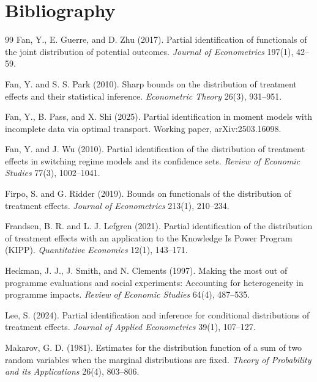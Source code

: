 \documentclass[11pt]{article}
\theoremstyle{definition}
\theoremstyle{plain}
\theoremstyle{remark}
\begin{document}
\section*{Bibliography}
\begin{thebibliography}{99}
Fan, Y., E. Guerre, and D. Zhu (2017).
Partial identification of functionals of the joint distribution of potential outcomes.
\emph{Journal of Econometrics} 197(1), 42--59.

Fan, Y. and S. S. Park (2010).
Sharp bounds on the distribution of treatment effects and their statistical inference.
\emph{Econometric Theory} 26(3), 931--951.

Fan, Y., B. Pass, and X. Shi (2025).
Partial identification in moment models with incomplete data via optimal transport.
Working paper, arXiv:2503.16098.

Fan, Y. and J. Wu (2010).
Partial identification of the distribution of treatment effects in switching regime
models and its confidence sets.
\emph{Review of Economic Studies} 77(3), 1002--1041.

Firpo, S. and G. Ridder (2019).
Bounds on functionals of the distribution of treatment effects.
\emph{Journal of Econometrics} 213(1), 210--234.

Frandsen, B. R. and L. J. Lefgren (2021).
Partial identification of the distribution of treatment effects with an application to
the Knowledge Is Power Program (KIPP).
\emph{Quantitative Economics} 12(1), 143--171.

Heckman, J. J., J. Smith, and N. Clements (1997).
Making the most out of programme evaluations and social experiments: Accounting for
heterogeneity in programme impacts.
\emph{Review of Economic Studies} 64(4), 487--535.

Lee, S. (2024).
Partial identification and inference for conditional distributions of treatment effects.
\emph{Journal of Applied Econometrics} 39(1), 107--127.

Makarov, G. D. (1981).
Estimates for the distribution function of a sum of two random variables when the
marginal distributions are fixed.
\emph{Theory of Probability and its Applications} 26(4), 803--806.


\end{thebibliography}
\end{document}
